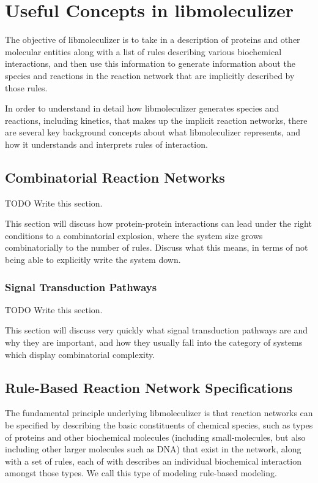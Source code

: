 \chapter{Useful Concepts in libmoleculizer}
\label{chap:conceptualOverviewChapter}

The objective of libmoleculizer is to take in a description of
proteins and other molecular entities along with a list of rules
describing various biochemical interactions, and then use this
information to generate information about the species and reactions in
the reaction network that are implicitly described by those rules.

In order to understand in detail how libmoleculizer generates species
and reactions, including kinetics, that makes up the implicit reaction
networks, there are several key background concepts about what
libmoleculizer represents, and how it understands and interprets rules
of interaction.

\section{Combinatorial Reaction Networks}
TODO Write this section.

This section will discuss how protein-protein interactions can lead
under the right conditions to a combinatorial explosion, where the
system size grows combinatorially to the number of rules.  Discuss
what this means, in terms of not being able to explicitly write the
system down.

\subsection{Signal Transduction Pathways}
TODO Write this section.

This section will discuss very quickly what signal transduction
pathways are and why they are important, and how they usually fall
into the category of systems which display combinatorial complexity.  

\section{Rule-Based Reaction Network Specifications}
\label{concRuleBasedSpec}

The fundamental principle underlying libmoleculizer is that reaction
networks can be specified by describing the basic constituents of
chemical species, such as types of proteins and other biochemical molecules
(including small-molecules, but also including other larger molecules
such as DNA) that exist in the network, along with a set of
rules, each of with describes an individual biochemical interaction
amongst those types.  We call this type of modeling rule-based
modeling.  


